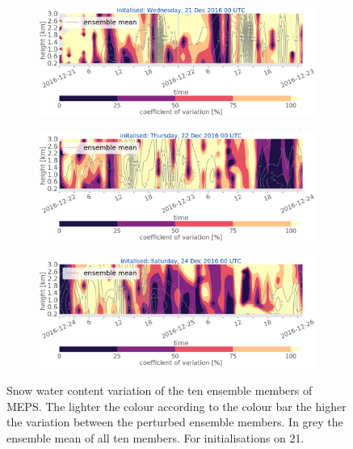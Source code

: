 \begin{figure}[H]
	\centering
	\begin{subfigure}[b]{\textwidth}
		\includegraphics[trim={0cm 5cm 0cm 0cm},clip,width=\textwidth]{./fig_variation/20161221}
		\caption{}\label{fig:vari:EM21}
	\end{subfigure}
	\begin{subfigure}[b]{\textwidth}
		\includegraphics[trim={0cm 5cm 0cm 0cm},clip,width=\textwidth]{./fig_variation/20161222}
		\caption{}\label{fig:vari:EM22}
	\end{subfigure}
	\begin{subfigure}[b]{\textwidth}
		\includegraphics[trim={0cm 0cm 0cm 0cm},clip,width=\textwidth]{./fig_variation/20161224}
		\caption{}\label{fig:vari:EM24}
	\end{subfigure}
	\caption{Snow water content variation of the ten ensemble members of MEPS. The lighter the colour according to the colour bar the higher the variation between the perturbed ensemble members. In grey the ensemble mean of all ten members. For initialisations on \SI{21}{\dec}. %
	}\label{fig:ens_vari:2124}
\end{figure}
